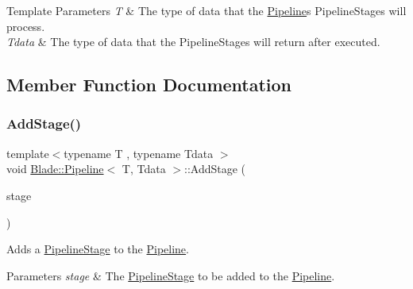 \begin{DoxyTemplParams}{Template Parameters}
{\em T} & The type of data that the \hyperlink{class_blade_1_1_pipeline}{Pipeline}\textquotesingle{}s Pipeline\+Stages will process. \\
\hline
{\em Tdata} & The type of data that the Pipeline\+Stages will return after executed. \\
\hline
\end{DoxyTemplParams}


\subsection{Member Function Documentation}
\mbox{\label{class_blade_1_1_pipeline_a9fb99991044731f11512623dee4f1879}} 
\subsubsection{\texorpdfstring{Add\+Stage()}{AddStage()}}
{\footnotesize\ttfamily template$<$typename T , typename Tdata $>$ \\
void \hyperlink{class_blade_1_1_pipeline}{Blade\+::\+Pipeline}$<$ T, Tdata $>$\+::Add\+Stage (\begin{DoxyParamCaption}\item[{\hyperlink{class_blade_1_1_pipeline_stage}{Pipeline\+Stage}$<$ T, Tdata $>$ $\ast$}]{stage }\end{DoxyParamCaption})\hspace{0.3cm}{\ttfamily [inline]}}



Adds a \hyperlink{class_blade_1_1_pipeline_stage}{Pipeline\+Stage} to the \hyperlink{class_blade_1_1_pipeline}{Pipeline}. 


\begin{DoxyParams}{Parameters}
{\em stage} & The \hyperlink{class_blade_1_1_pipeline_stage}{Pipeline\+Stage} to be added to the \hyperlink{class_blade_1_1_pipeline}{Pipeline}. \\
\hline
\end{DoxyParams}
\mbox{\label{class_blade_1_1_pipeline_a582e7f781de9f923a0c20a48019fb24f}} 
